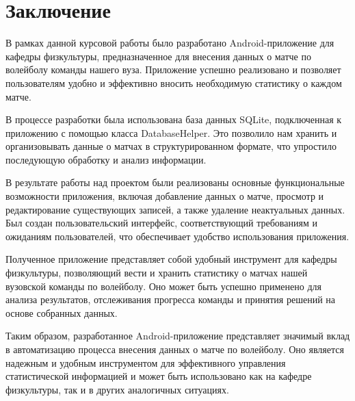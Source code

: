 \documentclass[12pt]{article}
\begin{document}
    \section{Заключение}
    В рамках данной курсовой работы было разработано Android-приложение для кафедры физкультуры, предназначенное для внесения данных о матче по волейболу команды нашего вуза.
    Приложение успешно реализовано и позволяет пользователям удобно и эффективно вносить необходимую статистику о каждом матче.

    В процессе разработки была использована база данных SQLite, подключенная к приложению с помощью класса DatabaseHelper.
    Это позволило нам хранить и организовывать данные о матчах в структурированном формате, что упростило последующую обработку и анализ информации.

    В результате работы над проектом были реализованы основные функциональные возможности приложения, включая добавление данных о матче, просмотр и редактирование существующих записей, а также удаление неактуальных данных.
    Был создан пользовательский интерфейс, соответствующий требованиям и ожиданиям пользователей, что обеспечивает удобство использования приложения.

    Полученное приложение представляет собой удобный инструмент для кафедры физкультуры, позволяющий вести и хранить статистику о матчах нашей вузовской команды по волейболу.
    Оно может быть успешно применено для анализа результатов, отслеживания прогресса команды и принятия решений на основе собранных данных.

    Таким образом, разработанное Android-приложение представляет значимый вклад в автоматизацию процесса внесения данных о матче по волейболу.
    Оно является надежным и удобным инструментом для эффективного управления статистической информацией и может быть использовано как на кафедре физкультуры, так и в других аналогичных ситуациях.
\end{document}
